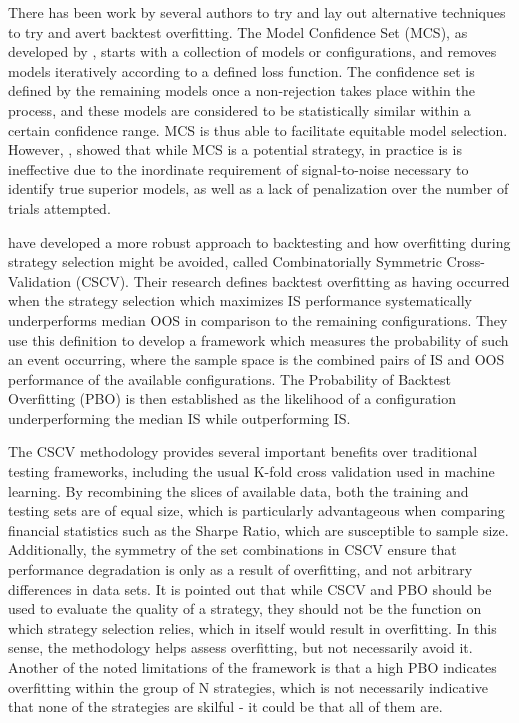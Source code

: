 \documentclass[a4paper,11pt,oneside]{article}
\theoremstyle{plain}
\theoremstyle{definition}
\begin{document}
	There has been work by several authors to try and lay out alternative techniques to try and avert backtest overfitting. 
	The Model Confidence Set (MCS), as developed by \citet{Hansen}, starts with a 
	collection of models or configurations, and removes models iteratively according to a defined loss function. 
	The confidence set is defined by the remaining models once a non-rejection takes place within the process, and 
	these models are considered to be statistically similar within a certain confidence range. MCS is thus able to facilitate 
	equitable model selection. However, \citet{Aparicio}, showed that while MCS is a potential strategy, in 
	practice is is ineffective due to the inordinate requirement of signal-to-noise necessary to identify true superior 
	models, as well as a lack of penalization over the number of trials attempted.
	\hfill \break
	
	\citet{BailyPBO} have developed a more robust approach to backtesting and how overfitting during strategy 
	selection might be avoided, called Combinatorially Symmetric Cross-Validation (CSCV). Their research defines backtest overfitting as having occurred when the strategy selection which maximizes IS performance systematically underperforms median OOS in comparison to the remaining configurations. They use this definition to develop a framework which measures the probability of such an event occurring, where the sample space is the combined pairs of IS and OOS performance of the available configurations. The Probability of Backtest Overfitting (PBO) is then established as the likelihood of a configuration underperforming the median IS while outperforming IS. 
	\hfill \break 
	
	The CSCV methodology provides several important benefits over traditional testing 
	frameworks, including the usual K-fold cross validation used in machine learning. By recombining the slices of 
	available data, both the training and testing sets are of equal size, which is particularly advantageous when comparing 
	financial statistics such as the Sharpe Ratio, which are susceptible to sample size. Additionally, the symmetry 
	of the set combinations in CSCV ensure that performance degradation is only as a result of overfitting, and not 
	arbitrary differences in data sets. It is pointed out that while CSCV and PBO should be used to evaluate the quality 
	of a strategy, they should not be the function on which strategy selection relies, which in itself would result in overfitting. In this sense, the methodology helps assess overfitting, but not necessarily avoid it. Another of the noted limitations of the framework is 
	that a high PBO indicates overfitting within the group of N strategies, which is not necessarily indicative that none 
	of the strategies are skilful - it could be that all of them are. 
	\hfill \break 
	
\end{document}
